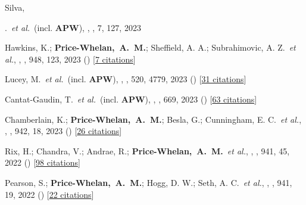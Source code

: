 \item[{\color{deemph}\scriptsize116}]Silva, {.~\textit{et al.}~(incl. \textbf{APW}), , \rnaas, 7, 127, 2023

\item[{\color{deemph}\scriptsize115}]Hawkins, K.; \textbf{Price-Whelan,~A.~M.}; Sheffield, A. A.; Subrahimovic, A. Z.~\textit{et al.}, , \apj, 948, 123, 2023 () [\href{http://adsabs.harvard.edu/abs/2023ApJ...948..123H}{7 citations}]

\item[{\color{deemph}\scriptsize114}]Lucey, M.~\textit{et al.}~(incl. \textbf{APW}), , \mnras, 520, 4779, 2023 () [\href{http://adsabs.harvard.edu/abs/2023MNRAS.520.4779L}{31 citations}]

\item[{\color{deemph}\scriptsize113}]Cantat-Gaudin, T.~\textit{et al.}~(incl. \textbf{APW}), , \aanda, 669, 2023 () [\href{http://adsabs.harvard.edu/abs/2023A&A...669A..55C}{63 citations}]

\item[{\color{deemph}\scriptsize112}]Chamberlain, K.; \textbf{Price-Whelan,~A.~M.}; Besla, G.; Cunningham, E. C.~\textit{et al.}, , \apj, 942, 18, 2023 () [\href{http://adsabs.harvard.edu/abs/2023ApJ...942...18C}{26 citations}]

\item[{\color{deemph}\scriptsize111}]Rix, H.; Chandra, V.; Andrae, R.; \textbf{Price-Whelan,~A.~M.}~\textit{et al.}, , \apj, 941, 45, 2022 () [\href{http://adsabs.harvard.edu/abs/2022ApJ...941...45R}{98 citations}]

\item[{\color{deemph}\scriptsize110}]Pearson, S.; \textbf{Price-Whelan,~A.~M.}; Hogg, D. W.; Seth, A. C.~\textit{et al.}, , \apj, 941, 19, 2022 () [\href{http://adsabs.harvard.edu/abs/2022ApJ...941...19P}{22 citations}]

}
